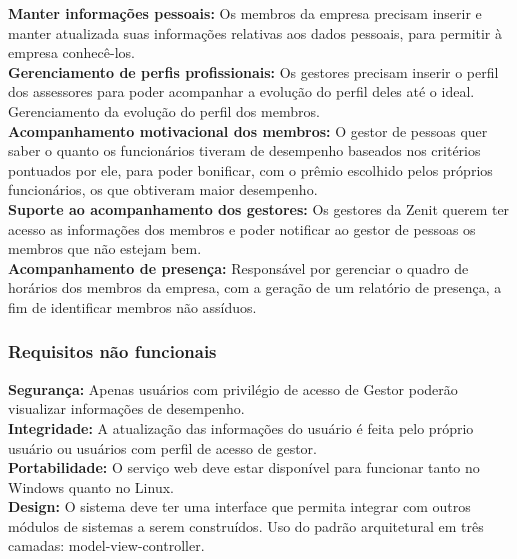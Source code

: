 \begin{anexosenv}
\textbf{Manter informações pessoais:} Os membros da empresa precisam inserir e manter atualizada suas informações relativas aos dados pessoais, para permitir à empresa conhecê-los.\\

\textbf{Gerenciamento de perfis profissionais:} Os gestores precisam inserir o perfil dos assessores para poder acompanhar a evolução do perfil deles até o ideal. Gerenciamento da evolução do perfil dos membros.\\

\textbf{Acompanhamento motivacional dos membros:} O gestor de pessoas quer saber o quanto os funcionários tiveram de desempenho baseados nos critérios pontuados por ele, para poder bonificar, com o prêmio escolhido pelos próprios funcionários, os que obtiveram maior desempenho.\\

\textbf{Suporte ao acompanhamento dos gestores:} Os gestores da Zenit querem ter acesso as informações dos membros e poder notificar ao gestor de pessoas os membros que não estejam bem.\\

\textbf{Acompanhamento de presença:} Responsável por gerenciar o quadro de horários dos membros da empresa, com a geração de um relatório de presença, a fim de identificar membros não assíduos.\\

\subsubsection[Requisitos não funcionais]{Requisitos não funcionais}

\textbf{Segurança:} Apenas usuários com privilégio de acesso de Gestor poderão visualizar informações de desempenho.\\

\textbf{Integridade:} A atualização das informações do usuário é feita pelo próprio usuário ou usuários com perfil de acesso de gestor.\\

\textbf{Portabilidade:} O serviço web deve estar disponível para funcionar tanto no Windows quanto no Linux.\\

\textbf{Design:} O sistema deve ter uma interface que permita integrar com outros módulos de sistemas a serem construídos. Uso do padrão arquitetural em três camadas: model-view-controller.\\


\end{anexosenv}
